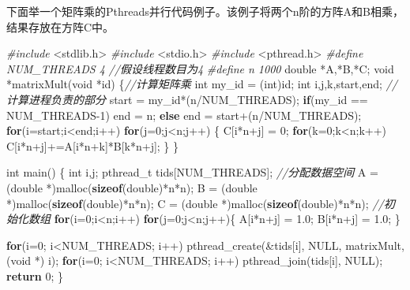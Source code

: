 \documentclass[]{ctexbook}
\newenvironment{Shaded}{\begin{snugshade}}{\end{snugshade}}
\newcommand{\CommentTok}[1]{\textcolor[rgb]{0.56,0.35,0.01}{\textit{#1}}}
\newcommand{\ControlFlowTok}[1]{\textcolor[rgb]{0.13,0.29,0.53}{\textbf{#1}}}
\newcommand{\DataTypeTok}[1]{\textcolor[rgb]{0.13,0.29,0.53}{#1}}
\newcommand{\DecValTok}[1]{\textcolor[rgb]{0.00,0.00,0.81}{#1}}
\newcommand{\FloatTok}[1]{\textcolor[rgb]{0.00,0.00,0.81}{#1}}
\newcommand{\ImportTok}[1]{#1}
\newcommand{\KeywordTok}[1]{\textcolor[rgb]{0.13,0.29,0.53}{\textbf{#1}}}
\newcommand{\NormalTok}[1]{#1}
\newcommand{\PreprocessorTok}[1]{\textcolor[rgb]{0.56,0.35,0.01}{\textit{#1}}}
\begin{document}
下面举一个矩阵乘的Pthreads并行代码例子。该例子将两个n阶的方阵A和B相乘，结果存放在方阵C中。

\begin{Shaded}
\begin{Highlighting}[]
\PreprocessorTok{\#include }\ImportTok{\textless{}stdlib.h\textgreater{}}
\PreprocessorTok{\#include }\ImportTok{\textless{}stdio.h\textgreater{}}
\PreprocessorTok{\#include }\ImportTok{\textless{}pthread.h\textgreater{}}
\PreprocessorTok{\#define NUM\_THREADS 4 }\CommentTok{//假设线程数目为4}
\PreprocessorTok{\#define n 1000}
\DataTypeTok{double}\NormalTok{ *A,*B,*C;}
\DataTypeTok{void}\NormalTok{ *matrixMult(}\DataTypeTok{void}\NormalTok{ *id) \{}\CommentTok{//计算矩阵乘}
    \DataTypeTok{int}\NormalTok{ my\_id = (}\DataTypeTok{int}\NormalTok{)id;}
    \DataTypeTok{int}\NormalTok{ i,j,k,start,end;}
    \CommentTok{//计算进程负责的部分}
\NormalTok{    start = my\_id*(n/NUM\_THREADS);}
    \ControlFlowTok{if}\NormalTok{(my\_id == NUM\_THREADS{-}}\DecValTok{1}\NormalTok{)}
\NormalTok{    end = n;}
    \ControlFlowTok{else}
\NormalTok{    end = start+(n/NUM\_THREADS);}
    \ControlFlowTok{for}\NormalTok{(i=start;i\textless{}end;i++)}
    \ControlFlowTok{for}\NormalTok{(j=}\DecValTok{0}\NormalTok{;j\textless{}n;j++) \{}
\NormalTok{        C[i*n+j] = }\DecValTok{0}\NormalTok{;}
        \ControlFlowTok{for}\NormalTok{(k=}\DecValTok{0}\NormalTok{;k\textless{}n;k++)}
\NormalTok{            C[i*n+j]+=A[i*n+k]*B[k*n+j];}
\NormalTok{    \}}
\NormalTok{\}}

\DataTypeTok{int}\NormalTok{ main() \{}
    \DataTypeTok{int}\NormalTok{ i,j;}
\NormalTok{    pthread\_t tids[NUM\_THREADS];}
    \CommentTok{//分配数据空间}
\NormalTok{    A = (}\DataTypeTok{double}\NormalTok{ *)malloc(}\KeywordTok{sizeof}\NormalTok{(}\DataTypeTok{double}\NormalTok{)*n*n);}
\NormalTok{    B = (}\DataTypeTok{double}\NormalTok{ *)malloc(}\KeywordTok{sizeof}\NormalTok{(}\DataTypeTok{double}\NormalTok{)*n*n);}
\NormalTok{    C = (}\DataTypeTok{double}\NormalTok{ *)malloc(}\KeywordTok{sizeof}\NormalTok{(}\DataTypeTok{double}\NormalTok{)*n*n);}
    \CommentTok{//初始化数组}
    \ControlFlowTok{for}\NormalTok{(i=}\DecValTok{0}\NormalTok{;i\textless{}n;i++)}
    \ControlFlowTok{for}\NormalTok{(j=}\DecValTok{0}\NormalTok{;j\textless{}n;j++)\{ }
\NormalTok{        A[i*n+j] = }\FloatTok{1.0}\NormalTok{;}
\NormalTok{        B[i*n+j] = }\FloatTok{1.0}\NormalTok{;}
\NormalTok{    \}}

    \ControlFlowTok{for}\NormalTok{(i=}\DecValTok{0}\NormalTok{; i\textless{}NUM\_THREADS; i++)}
\NormalTok{        pthread\_create(\&tids[i], NULL, matrixMult, (}\DataTypeTok{void}\NormalTok{ *) i);}
    \ControlFlowTok{for}\NormalTok{(i=}\DecValTok{0}\NormalTok{; i\textless{}NUM\_THREADS; i++)}
\NormalTok{        pthread\_join(tids[i], NULL);}
    \ControlFlowTok{return} \DecValTok{0}\NormalTok{;}
\NormalTok{\}}
\end{Highlighting}
\end{Shaded}
\end{document}
